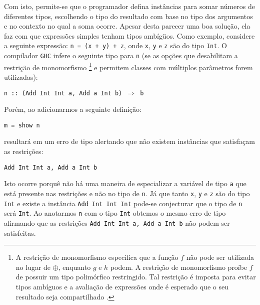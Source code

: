 Com isto, permite-se que o programador defina inst\^ancias para somar n\'umeros de diferentes 
tipos, escolhendo o tipo do resultado com base no tipo dos argumentos e no contexto no qual a soma ocorre. 
Apesar desta parecer uma boa solu\c{c}\~ao, ela faz com que express\~oes simples tenham tipos amb\'ig\"uos. Como exemplo,
considere a seguinte express\~ao: \texttt{n = (x + y) + z}, onde \texttt{x}, \texttt{y} e \texttt{z} s\~ao do tipo 
\texttt{Int}. O compilador \texttt{GHC} infere o seguinte tipo para \texttt{n} (se as op\c{c}\~oes que desabilitam a
restri\c{c}\~ao de monomorfismo \footnote{
{\parindent 0pt }
\hspace*{.2cm}
\begin{minipage}[t]{.4\textwidth}{{\parindent 0pt 
\vspace*{\baselineskip}
A restri\c{c}\~ao de monomorfismo especifica que a fun\c{c}\~ao $f$ n\~ao pode ser utilizada
no lugar de $\oplus$, enquanto $g$ e $h$ podem. A restri\c{c}\~ao de monomorfismo pro\'ibe $f$ de possuir um tipo
polim\'orfico restringido. Tal restri\c{c}\~ao \'e imposta para evitar tipos amb\'iguos e a avalia\c{c}\~ao de 
express\~oes onde \'e esperado que o seu resultado seja compartilhado \cite{Haskell98}.}}
\end{minipage}} 
e permitem classes com m\'ultiplos par\^ametros forem utilizadas):
\begin{center}
	\texttt{n :: (Add Int Int a, Add a Int b) $\Rightarrow$ b}
\end{center}
Por\'em, ao adicionarmos a seguinte defini\c{c}\~ao:
\begin{center}
	\texttt{m = show n}
\end{center}
resultar\'a em um erro de tipo alertando que n\~ao existem inst\^ancias que satisfa\c{c}am as restri\c{c}\~oes:
\begin{center}
	\texttt{Add Int Int a, Add a Int b}
\end{center}
Isto ocorre porqu\^e n\~ao h\'a uma maneira de especializar a vari\'avel de tipo \texttt{a} que est\'a presente nas 
restri\c{c}\~oes e n\~ao no tipo de \texttt{n}. J\'a que tanto \texttt{x}, \texttt{y} e \texttt{z} s\~ao do tipo 
\texttt{Int} e existe a inst\^ancia \texttt{Add Int Int Int} pode-se conjecturar que o tipo de \texttt{n} ser\'a
\texttt{Int}. Ao anotarmos \texttt{n} com o tipo \texttt{Int} obtemos o mesmo erro de tipo afirmando que as 
restri\c{c}\~oes \texttt{Add Int Int a, Add a Int b} n\~ao podem ser satisfeitas.

